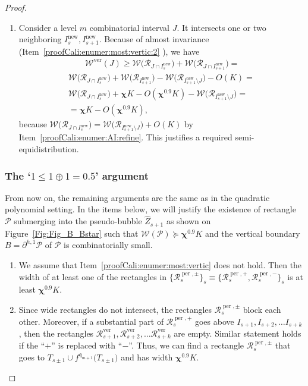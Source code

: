 \documentclass{amsart}
\newcommand{\1}{{\mathbb 1 }}
\newcommand{\Width}{{\mathcal W}}
\newcommand\RR{\mathcal{R}}
\newcommand{\wZ}{{\widehat Z}}
\newcommand{\qq}{\mathfrak{q}}
\newcommand\new{{\operatorname{new}}}
\newcommand\ver{{\operatorname{ver}}}
\newcommand\per{{\operatorname{per}}}
\theoremstyle{remark}
\numberwithin{equation}{section}
\theoremstyle{definition}
\newcommand{\bchi}{{\boldsymbol{ \chi}}}
\begin{document}
\begin{proof}
\begin{enumerate}[label=\text{(\arabic*)},font=\normalfont,leftmargin=*,start=13]
\item \label{proofCali:enumer:most:vertic:3}Consider a level $m$ combinatorial interval $J$. It intersects one or two neighboring $I^\new_s, I_{s+1}^\new$. Because of almost invariance (Item~\ref{proofCali:enumer:most:vertic:2} ), we have
\begin{multline*}
   \qquad \Width^\ver(J)\ge\Width\Big(\RR_{J\cap I_s^\new}\Big)+\Width\Big(\RR_{J\cap I_{s+1}^\new}\Big)=\\ \Width\Big(\RR_{J\cap I_s^\new}\Big)+ \Width\Big(\RR_{ I_{s+1}^\new}\Big) - \Width\Big(\RR_{I_{s+1}^\new\setminus  J}\Big) - O(K) =\\
   \Width\Big(\RR_{J\cap I_s^\new}\Big) +\bchi K -O(\bchi^{0.9} K)- \Width\Big(\RR_{I_{s+1}^{\new}\setminus J}\Big)= \\ =\bchi K -O(\bchi^{0.9} K),\qquad
\end{multline*}
because $\Width\Big(\RR_{J\cap I_s^\new}\Big)=\Width\Big(\RR_{ I_{s+1}^{\new}\setminus J}\Big)+O(K)$ by Item~\ref{proofCali:enumer:AI:refine}.
This justifies a required semi-equidistribution.
\end{enumerate}


\subsubsection{The `$1 \leq 1\oplus 1 = 0.5$' argument} From now on, the remaining arguments are the same
as in the quadratic polynomial setting. In the items below, we will justify the existence of rectangle $\mathcal P$ submerging into the pseudo-bubble $\wZ_{s+1}$ as shown on Figure~\ref{Fig:Fig_B_Bstar} such that $\Width(\mathcal P)\succeq \bchi^{0.9} K$ and the vertical boundary $B=\partial ^{h,1}\mathcal P$ of $\mathcal P$ is combinatorially small.

\begin{enumerate}[label=\text{(\arabic*)},font=\normalfont,leftmargin=*,start=16]
 \item \label{proofCali:enumer:many:per}  We assume that Item~\ref{proofCali:enumer:most:vertic} does not hold. Then the width of at least one of the rectangles in $\big\{\RR^{\per,\pm}_s\big\}_s\equiv \big\{\RR^{\per,+}_s, \RR^{\per,-}_s\big\}_s$ is at least $\bchi^{0.9} K$.
  
    \item  Since wide rectangles do not intersect, the rectangles $\RR^{\per,\pm}_s$ block each other. Moreover, if a substantial part of $\RR^{\per,+}_s$ goes above $I_{s+1},I_{s+2},\dots I_{s+k}$, then the rectangles $\RR^\ver_{s+1},\RR^\ver_{s+2},\dots \RR^\ver_{s+k}$ are empty. Similar statement holds if the ``$+$'' is replaced with ``$-$''. Thus, we can find a rectangle $\RR^{\per,\pm}_s$ 
   that goes to $T_{s\pm 1 }\cup f^{\qq_{m+1}}\big(T_{s\pm 1 }\big)$ and has width $\bchi^{0.9} K$.
   

\end{enumerate}
\end{proof}
\end{document}
